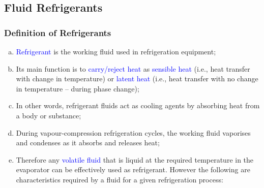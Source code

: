 \documentclass[10pt,compress,handout,ignorenonframetext]{beamer}
\begin{document}
\subsection{Fluid Refrigerants}
\begin{frame}
 \frametitle{Definition of Refrigerants}
  \begin{enumerate}[(a)]
   \item <1-> \textcolor{blue}{Refrigerant} is the working fluid used in refrigeration equipment; 
   \item <2-> Its main function is to \textcolor{blue}{carry/reject heat} as \textcolor{blue}{sensible heat} (i.e., heat transfer with change in temperature) or \textcolor{blue}{latent heat} (i.e., heat transfer with no change in temperature -- during phase change);
   \item <3-> In other words, refrigerant fluids act as cooling agents by absorbing heat from a body or substance;
   \item <4-> During vapour-compression refrigeration cycles, the working fluid vaporises and condenses as it absorbs and releases heat;
   \item <5-> Therefore any \textcolor{blue}{volatile fluid} that is liquid at the required temperature in the evaporator can be effectively used as refrigerant. However the following are characteristics required by a fluid for a given refrigeration process:
  \end{enumerate}
\end{frame}
\end{document}
